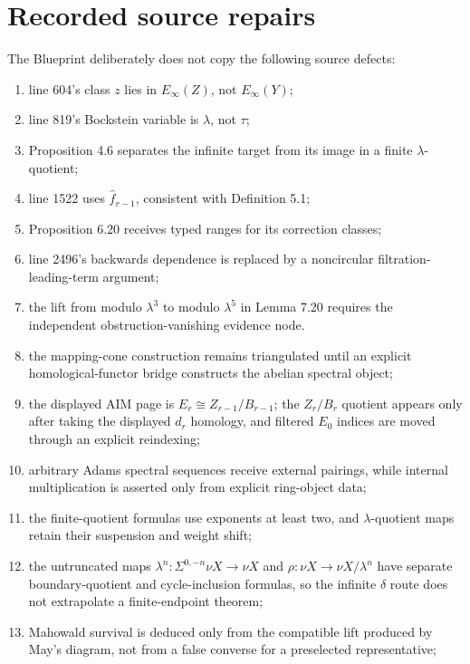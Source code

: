 \section{Recorded source repairs}

The Blueprint deliberately does not copy the following source defects:
\begin{enumerate}
  \item line 604's class $z$ lies in $E_\infty(Z)$, not $E_\infty(Y)$;
  \item line 819's Bockstein variable is $\lambda$, not $\tau$;
  \item Proposition 4.6 separates the infinite target from its image in a
    finite $\lambda$-quotient;
  \item line 1522 uses $\widehat f_{r-1}$, consistent with Definition 5.1;
  \item Proposition 6.20 receives typed ranges for its correction classes;
  \item line 2496's backwards dependence is replaced by a noncircular
    filtration-leading-term argument;
  \item the lift from modulo $\lambda^3$ to modulo $\lambda^5$ in Lemma 7.20
    requires the independent obstruction-vanishing evidence node.
  \item the mapping-cone construction remains triangulated until an explicit
    homological-functor bridge constructs the abelian spectral object;
  \item the displayed AIM page is
    $E_r\cong Z_{r-1}/B_{r-1}$; the $Z_r/B_r$ quotient appears only after
    taking the displayed $d_r$ homology, and filtered $E_0$ indices are moved
    through an explicit reindexing;
  \item arbitrary Adams spectral sequences receive external pairings, while
    internal multiplication is asserted only from explicit ring-object data;
  \item the finite-quotient formulas use exponents at least two, and
    $\lambda$-quotient maps retain their suspension and weight shift;
  \item the untruncated maps
    $\lambda^n:\Sigma^{0,-n}\nu X\to\nu X$ and
    $\rho:\nu X\to\nu X/\lambda^n$ have separate boundary-quotient and
    cycle-inclusion formulas, so the infinite $\delta$ route does not
    extrapolate a finite-endpoint theorem;
  \item Mahowald survival is deduced only from the compatible lift produced by
    May's diagram, not from a false converse for a preselected representative;

\end{enumerate}
